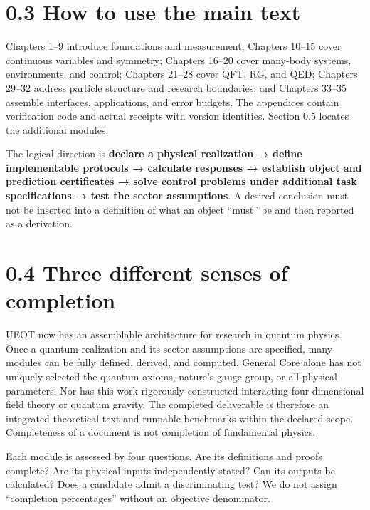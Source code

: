 \documentclass[
  11pt,
  oneside]{book}
\begin{document}
\section{0.3 How to use the main text}

Chapters 1--9 introduce foundations and measurement; Chapters 10--15
cover continuous variables and symmetry; Chapters 16--20 cover many-body
systems, environments, and control; Chapters 21--28 cover QFT, RG, and
QED; Chapters 29--32 address particle structure and research boundaries;
and Chapters 33--35 assemble interfaces, applications, and error
budgets. The appendices contain verification code and actual receipts
with version identities. Section 0.5 locates the additional modules.

The logical direction is \textbf{declare a physical realization → define
implementable protocols → calculate responses → establish object and
prediction certificates → solve control problems under additional task
specifications → test the sector assumptions}. A desired conclusion must
not be inserted into a definition of what an object ``must'' be and then
reported as a derivation.

\section{0.4 Three different senses of completion}

UEOT now has an assemblable architecture for research in quantum
physics. Once a quantum realization and its sector assumptions are
specified, many modules can be fully defined, derived, and computed.
General Core alone has not uniquely selected the quantum axioms,
nature's gauge group, or all physical parameters. Nor has this work
rigorously constructed interacting four-dimensional field theory or
quantum gravity. The completed deliverable is therefore an integrated
theoretical text and runnable benchmarks within the declared scope.
Completeness of a document is not completion of fundamental physics.

Each module is assessed by four questions. Are its definitions and
proofs complete? Are its physical inputs independently stated? Can its
outputs be calculated? Does a candidate admit a discriminating test? We
do not assign ``completion percentages'' without an objective
denominator.
\end{document}
